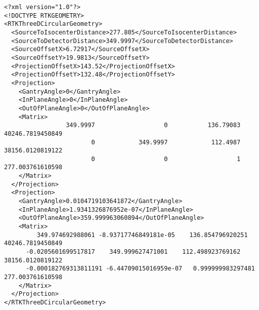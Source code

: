 \documentclass{article}
\begin{document}
\begin{verbatim}
<?xml version="1.0"?>
<!DOCTYPE RTKGEOMETRY>
<RTKThreeDCircularGeometry>
  <SourceToIsocenterDistance>277.805</SourceToIsocenterDistance>
  <SourceToDetectorDistance>349.9997</SourceToDetectorDistance>
  <SourceOffsetX>6.72917</SourceOffsetX>
  <SourceOffsetY>19.9813</SourceOffsetY>
  <ProjectionOffsetX>143.52</ProjectionOffsetX>
  <ProjectionOffsetY>132.48</ProjectionOffsetY>
  <Projection>
    <GantryAngle>0</GantryAngle>
    <InPlaneAngle>0</InPlaneAngle>
    <OutOfPlaneAngle>0</OutOfPlaneAngle>
    <Matrix>
                 349.9997                   0           136.79083    40246.7819450849
                        0            349.9997            112.4987    38156.0120819122
                        0                   0                   1    277.003761610598
    </Matrix>
  </Projection>
  <Projection>
    <GantryAngle>0.0104719103641872</GantryAngle>
    <InPlaneAngle>1.9341326876952e-07</InPlaneAngle>
    <OutOfPlaneAngle>359.999963060894</OutOfPlaneAngle>
    <Matrix>
         349.974692988061 -8.93717746849181e-05    136.854796920251    40246.7819450849
      -0.0205601699517817    349.999627471001    112.498923769162    38156.0120819122
      -0.000182769313811191 -6.44709015016959e-07   0.999999983297481    277.003761610598
    </Matrix>
  </Projection>
</RTKThreeDCircularGeometry>
\end{verbatim}
\end{document}
